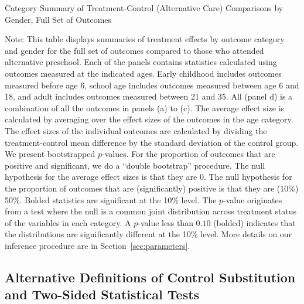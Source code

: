 \begin{table}[h!]
\centering
\begin{threeparttable}
\caption{Category Summary of Treatment-Control (Alternative Care) Comparisons by Gender, Full Set of Outcomes}\label{tab:rosenbaum-table-cats-exp-TvCa-big}

\begin{tablenotes}
\item  \tiny Note:  This table displays summaries of treatment effects by outcome category and gender for the full set of outcomes compared to those who attended alternative preschool. Each of the panels contains statistics calculated using outcomes measured at the indicated ages. Early childhood includes outcomes measured before age 6, school age includes outcomes measured between age 6 and 18, and adult includes outcomes measured between 21 and 35. All (panel d) is a combination of all the outcomes in panels (a) to (c). The average effect size is calculated by averaging over the effect sizes of the outcomes in the age category. The effect sizes of the individual outcomes are calculated by dividing the treatment-control mean difference by the standard deviation of the control group. We present bootstrapped $p$-values. For the proportion of outcomes that are positive and significant, we do a ``double bootstrap'' procedure. The null hypothesis for the average effect sizes is that they are 0. The null hypothesis for the proportion of outcomes that are (significantly) positive is that they are (10\%) 50\%. Bolded statistics are significant at the 10\% level. The \citet{Rosenbaum_2005_Distribution_JRSS} $p$-value originates from a test where the null is a common joint distribution  across treatment status of the variables in each category. A $p$-value less than $0.10$ (bolded) indicates that the distributions are significantly different at the 10\% level. More details on our inference procedure are in Section~\ref{sec:parameters}.
\end{tablenotes}
\end{threeparttable}
\end{table}

\clearpage


\doublespacing

\subsection{Alternative Definitions of Control Substitution and Two-Sided Statistical Tests} \label{appendix:vsensitivity}

